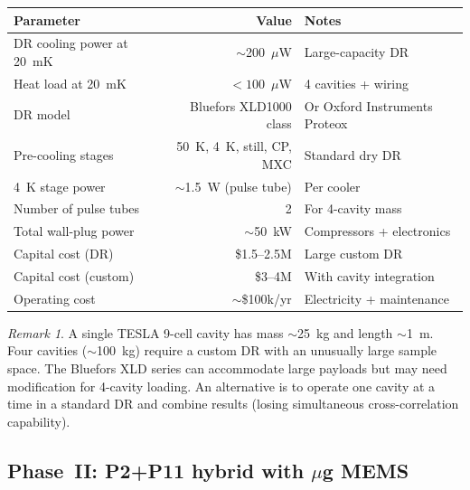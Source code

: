 \documentclass[11pt]{article}
\theoremstyle{definition}
\theoremstyle{remark}
\newtheorem{remark}[theorem]{Remark}
\begin{document}
\begin{center}
\renewcommand{\arraystretch}{1.3}
\begin{tabular}{lrl}
\toprule
Parameter & Value & Notes \\
\midrule
DR cooling power at 20~mK & $\sim$200~$\mu$W & Large-capacity DR \\
Heat load at 20~mK & $<100$~$\mu$W & 4 cavities + wiring \\
DR model & Bluefors XLD1000 class & Or Oxford Instruments Proteox \\
Pre-cooling stages & 50~K, 4~K, still, CP, MXC & Standard dry DR \\
4~K stage power & $\sim$1.5~W (pulse tube) & Per cooler \\
Number of pulse tubes & 2 & For 4-cavity mass \\
Total wall-plug power & $\sim$50~kW & Compressors + electronics \\
\midrule
Capital cost (DR) & \$1.5--2.5M & Large custom DR \\
Capital cost (custom) & \$3--4M & With cavity integration \\
Operating cost & $\sim$\$100k/yr & Electricity + maintenance \\
\bottomrule
\end{tabular}
\end{center}

\begin{remark}
A single TESLA 9-cell cavity has mass $\sim$25~kg and length $\sim$1~m.
Four cavities ($\sim$100~kg) require a custom DR with an unusually large
sample space. The Bluefors XLD series can accommodate large payloads
but may need modification for 4-cavity loading. An alternative is to
operate one cavity at a time in a standard DR and combine results
(losing simultaneous cross-correlation capability).
\end{remark}

\subsection{Phase~II: P2+P11 hybrid with $\mu$g MEMS}
\end{document}
